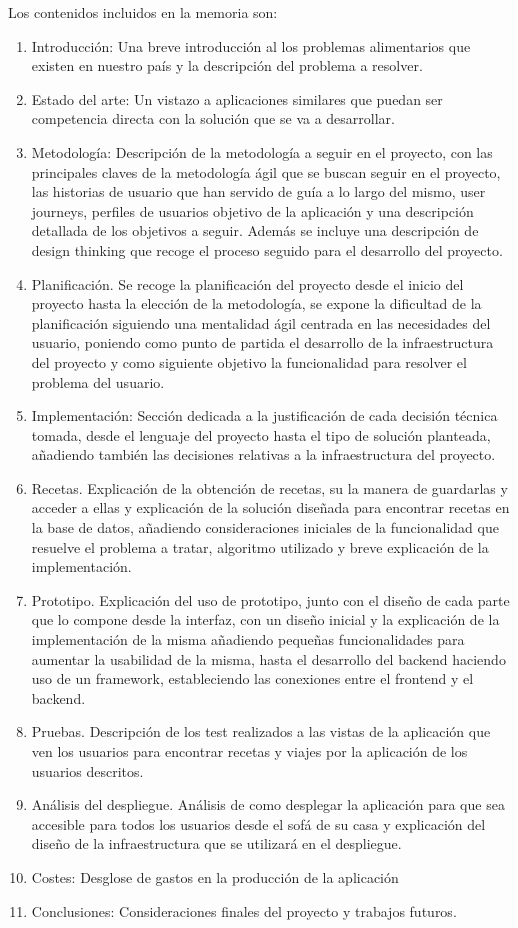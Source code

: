 Los contenidos incluidos en la memoria son:
\begin{enumerate}
    \item Introducción: Una breve introducción al los problemas alimentarios que existen en nuestro país y la descripción del problema a resolver.
    \item Estado del arte: Un vistazo a aplicaciones similares que puedan ser competencia directa con la solución que se va a desarrollar.
    \item Metodología: Descripción de la metodología a seguir en el proyecto, con las principales claves de la metodología ágil que se buscan seguir en el proyecto, las historias de usuario que han servido de guía a lo largo del mismo, user journeys, perfiles de usuarios objetivo de la aplicación y una descripción detallada de los objetivos a seguir. Además se incluye una descripción de design thinking que recoge el proceso seguido para el desarrollo del proyecto.
    \item Planificación. Se recoge la planificación del proyecto desde el inicio del proyecto hasta la elección de la metodología, se expone la dificultad de la planificación siguiendo una mentalidad ágil centrada en las necesidades del usuario, poniendo como punto de partida el desarrollo de la infraestructura del proyecto y como siguiente objetivo la funcionalidad para resolver el problema del usuario.
    \item Implementación: Sección dedicada a la justificación de cada decisión técnica tomada, desde el lenguaje del proyecto hasta el tipo de solución planteada, añadiendo también las decisiones relativas a la infraestructura del proyecto.
    \item Recetas. Explicación de la obtención de recetas, su la manera de guardarlas y acceder a ellas y explicación de la solución diseñada para encontrar recetas en la base de datos, añadiendo consideraciones iniciales de la funcionalidad que resuelve el problema a tratar, algoritmo utilizado y breve explicación de la implementación.
    \item Prototipo. Explicación del uso de prototipo, junto con el diseño de cada parte que lo compone desde la  interfaz, con un diseño inicial y la explicación de la implementación de la misma añadiendo pequeñas funcionalidades para aumentar la usabilidad de la misma, hasta el desarrollo del backend haciendo uso de un framework, estableciendo las conexiones entre el frontend y el backend.
    \item Pruebas. Descripción de los test realizados a las vistas de la aplicación que ven los usuarios para encontrar recetas y viajes por la aplicación de los usuarios descritos.
    \item Análisis del despliegue. Análisis de como desplegar la aplicación para que sea accesible para todos los usuarios desde el sofá de su casa y explicación del diseño de la infraestructura que se utilizará en el despliegue.
    \item Costes: Desglose de gastos en la producción de la aplicación
    \item Conclusiones: Consideraciones finales del proyecto y trabajos futuros.
\end{enumerate}
\cleardoublepage


